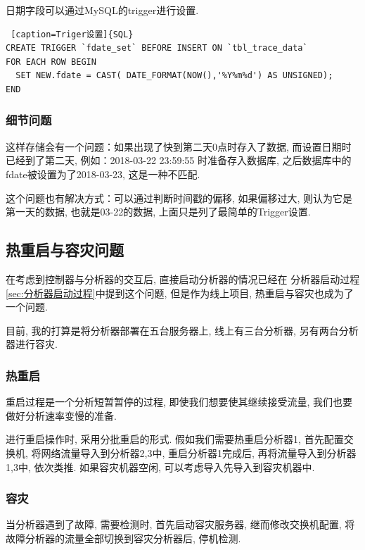 日期字段可以通过MySQL的trigger进行设置.


\begin{lstlisting} [caption=Triger设置]{SQL}
CREATE TRIGGER `fdate_set` BEFORE INSERT ON `tbl_trace_data`
FOR EACH ROW BEGIN
  SET NEW.fdate = CAST( DATE_FORMAT(NOW(),'%Y%m%d') AS UNSIGNED);
END
\end{lstlisting}

\subsubsection{细节问题}

这样存储会有一个问题：如果出现了快到第二天0点时存入了数据,
而设置日期时已经到了第二天, 例如：2018-03-22 23:59:55 时准备存入数据库,
之后数据库中的fdate被设置为了2018-03-23, 这是一种不匹配.

这个问题也有解决方式：可以通过判断时间戳的偏移, 如果偏移过大, 则认为它是
第一天的数据, 也就是03-22的数据, 上面只是列了最简单的Trigger设置.

\subsection{热重启与容灾问题}
\label{sec:热重启与容灾问题}

在考虑到控制器与分析器的交互后, 直接启动分析器的情况已经在
分析器启动过程\ref{sec:分析器启动过程}中提到这个问题,
但是作为线上项目, 热重启与容灾也成为了一个问题.

目前, 我的打算是将分析器部署在五台服务器上, 线上有三台分析器, 另有两台分析器进行容灾.

\subsubsection{热重启}

重启过程是一个分析短暂暂停的过程, 即使我们想要使其继续接受流量,
我们也要做好分析速率变慢的准备.


进行重启操作时, 采用分批重启的形式. 假如我们需要热重启分析器1,
首先配置交换机, 将网络流量导入到分析器2,3中, 重启分析器1完成后,
再将流量导入到分析器1,3中, 依次类推. 如果容灾机器空闲,
可以考虑导入先导入到容灾机器中.

\subsubsection{容灾}

当分析器遇到了故障, 需要检测时, 首先启动容灾服务器, 继而修改交换机配置,
将故障分析器的流量全部切换到容灾分析器后, 停机检测.

